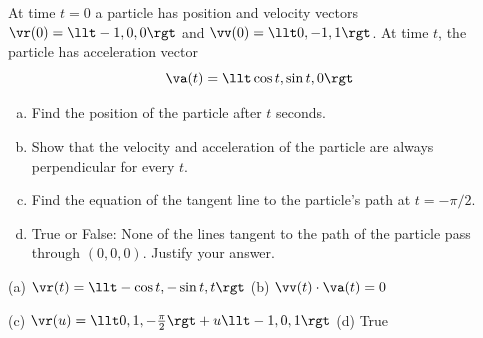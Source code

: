 \begin{question} [M200 2003A] %
 At time $t=0$ a particle has position and velocity vectors
$\vr(0)=\llt -1,0,0\rgt$ and $\vv(0)=\llt 0,-1,1\rgt$. At time $t$, 
the particle has acceleration vector 
\begin{equation*}
\va(t)=\llt \cos t,\sin t,0\rgt
\end{equation*}
\begin{enumerate}[(a)]
\item 
Find the position of the particle after $t$ seconds.
\item 
Show that the velocity and acceleration of the particle are
always perpendicular for every $t$. 
\item
 Find the equation of the tangent line to the particle's path
at $t=-\pi/2$. 
\item
True or False: None of the lines tangent to the path of the
particle pass through $(0,0,0)$. Justify your answer.
\end{enumerate} 
\end{question}


\begin{answer}
(a) $\vr(t)=\llt -\cos t, -\sin t, t\rgt$\qquad
(b) $\vv(t)\cdot\va(t)=0$

(c) $\vr(u)=\llt 0,1,-\frac{\pi}{2}\rgt+u\llt -1,0,1\rgt$\qquad
(d) True
\end{answer}

